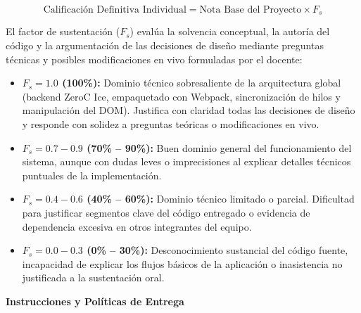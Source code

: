 \documentclass[10pt,letterpaper]{article}
\newcommand{\sectionBadge}[1]{%
  \refstepcounter{section}%
  \vspace{0.24cm}%
  \noindent%
  \colorbox{icesiBlue}{\color{white}\rule[-0.08cm]{0pt}{0.42cm}\hspace{0.16cm}\textbf{\normalsize \thesection}\hspace{0.16cm}}%
  \hspace{0.18cm}%
  {\fontsize{9.5}{12}\selectfont\textbf{\color{icesiDark}#1}}\\[-0.10cm]%
  \noindent{\color{icesiDark}\rule{\textwidth}{0.8pt}}\vspace{0.10cm}%
}
\begin{document}
\begin{equation*}
\text{Calificación Definitiva Individual} = \text{Nota Base del Proyecto} \times F_s
\end{equation*}

\noindent
El factor de sustentación ($F_s$) evalúa la solvencia conceptual, la autoría del código y la argumentación de las decisiones de diseño mediante preguntas técnicas y posibles modificaciones en vivo formuladas por el docente:

\begin{itemize}[leftmargin=*, itemsep=2pt]
  \item \textbf{$F_s = 1.0$ (100\%):} Dominio técnico sobresaliente de la arquitectura global (backend ZeroC Ice, empaquetado con Webpack, sincronización de hilos y manipulación del DOM). Justifica con claridad todas las decisiones de diseño y responde con solidez a preguntas teóricas o modificaciones en vivo.
  \item \textbf{$F_s = 0.7 - 0.9$ (70\% -- 90\%):} Buen dominio general del funcionamiento del sistema, aunque con dudas leves o imprecisiones al explicar detalles técnicos puntuales de la implementación.
  \item \textbf{$F_s = 0.4 - 0.6$ (40\% -- 60\%):} Dominio técnico limitado o parcial. Dificultad para justificar segmentos clave del código entregado o evidencia de dependencia excesiva en otros integrantes del equipo.
  \item \textbf{$F_s = 0.0 - 0.3$ (0\% -- 30\%):} Desconocimiento sustancial del código fuente, incapacidad de explicar los flujos básicos de la aplicación o inasistencia no justificada a la sustentación oral.
\end{itemize}

\vspace{6pt}

\sectionBadge{Instrucciones y Políticas de Entrega}
\end{document}
